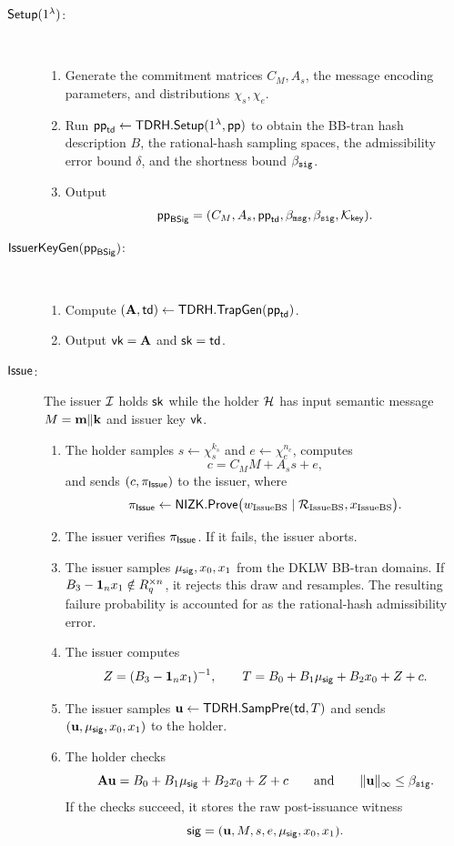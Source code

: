 \begin{description}
\item[\(\mathsf{Setup}(1^\lambda)\):]~
\begin{enumerate}[leftmargin=1.25em]
  \item Generate the commitment matrices \(C_M,A_s\), the message encoding parameters, and distributions
  \(\chi_s,\chi_e\).
  \item Run \(\mathsf{pp}_{\mathsf{td}}\gets\mathsf{TDRH}.\mathsf{Setup}(1^\lambda,\mathsf{pp})\) to obtain the BB-tran hash
  description \(B\), the rational-hash sampling spaces, the admissibility error bound \(\delta\), and the
  shortness bound \(\beta_{\mathtt{sig}}\).
  \item Output
  \[
    \mathsf{pp}_{\mathsf{BSig}}=(C_M,A_s,\mathsf{pp}_{\mathsf{td}},\beta_{\mathtt{msg}},\beta_{\mathtt{sig}},\mathcal K_{\mathsf{key}}).
  \]
\end{enumerate}

\item[\(\mathsf{IssuerKeyGen}(\mathsf{pp}_{\mathsf{BSig}})\):]~
\begin{enumerate}[leftmargin=1.25em]
  \item Compute \((\mathbf{A},\mathsf{td})\gets \mathsf{TDRH}.\mathsf{TrapGen}(\mathsf{pp}_{\mathsf{td}})\).
  \item Output \(\mathsf{vk}=\mathbf{A}\) and \(\mathsf{sk}=\mathsf{td}\).
\end{enumerate}

\item[\(\mathsf{Issue}\):] The issuer \(\mathcal{I}\) holds \(\mathsf{sk}\) while the holder \(\mathcal{H}\) has input semantic message
\(M=\mathbf{m}\Vert\mathbf{k}\) and issuer key \(\mathsf{vk}\).
\begin{enumerate}[leftmargin=1.25em]
  \item The holder samples \(s\leftarrow\chi_s^{k_s}\) and \(e\leftarrow\chi_e^{n_c}\), computes
  \[
    c=C_MM+A_s s+e,
  \]
  and sends \((c,\pi_{\mathsf{Issue}})\) to the issuer, where
  \[
    \pi_{\mathsf{Issue}}\gets \mathsf{NIZK}.\mathsf{Prove}
      \bigl(w_{\mathrm{IssueBS}}\mid \mathcal R_{\mathrm{IssueBS}},x_{\mathrm{IssueBS}}\bigr).
  \]
  \item The issuer verifies \(\pi_{\mathsf{Issue}}\).  If it fails, the issuer aborts.
  \item The issuer samples \(\mu_{\mathsf{sig}},x_0,x_1\) from the DKLW BB-tran domains.  If
  \(B_3-\mathbf 1_nx_1\notin R_q^{\times n}\), it rejects this draw and resamples.  The resulting failure
  probability is accounted for as the rational-hash admissibility error.
  \item The issuer computes
  \[
    Z=(B_3-\mathbf 1_nx_1)^{-1},
    \qquad
    T=B_0+B_1\mu_{\mathsf{sig}}+B_2x_0+Z+c.
  \]
  \item The issuer samples \(\mathbf{u}\gets \mathsf{TDRH}.\mathsf{SampPre}(\mathsf{td},T)\) and sends
  \((\mathbf{u},\mu_{\mathsf{sig}},x_0,x_1)\) to the holder.
  \item The holder checks
  \[
    \mathbf{A}\mathbf{u}=B_0+B_1\mu_{\mathsf{sig}}+B_2x_0+Z+c
    \qquad\text{and}\qquad
    \|\mathbf{u}\|_\infty\le \beta_{\mathtt{sig}}.
  \]
  If the checks succeed, it stores the raw post-issuance witness
  \[
    \mathsf{sig}=(\mathbf{u},M,s,e,\mu_{\mathsf{sig}},x_0,x_1).
  \]
\end{enumerate}


\end{description}
